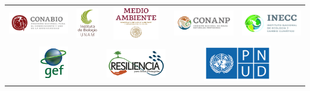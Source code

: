 \begin{titlepage}
\begin{center}
\begin{table}[h!]
\begin{tabular}{ccccc}
				\includegraphics[width=3cm]{./logos/conabio_ver2_m.jpg} &
				\includegraphics[height=1.5cm]{./logos/umam_instituto-biologia_m.png} &
				\includegraphics[height=1.5cm]{./logos/semarnat_ver2.jpg} &
				\includegraphics[width=3cm]{./logos/conanp_ver2.jpg} &
				\includegraphics[width=3cm]{./logos/inecc_ver2.jpg} \\



				\multicolumn{2}{c}{\includegraphics[height=1.5cm]{./logos/gef.png}} &
				\multicolumn{1}{c}{\includegraphics[width=3cm]{./logos/resiliencia.png}} &
				\multicolumn{2}{c}{\includegraphics[width=3cm]{./logos/pnud.png}}



\end{tabular}
\end{table}
\end{center}
\end{titlepage}
